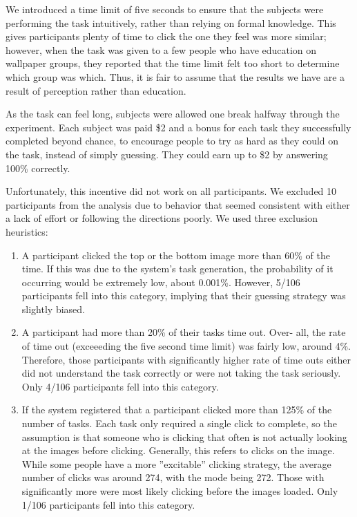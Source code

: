 We introduced a time limit of five seconds to ensure that the subjects were performing the task intuitively, rather than relying on formal knowledge. This gives participants plenty of time to click the one they feel was more similar; however, when the task was given to a few people who have education on wallpaper groups, they reported that the time limit felt too short to determine which group was which. Thus, it is fair to assume that the results we have are a result of perception rather than education.

As the task can feel long, subjects were allowed one break halfway through the experiment. Each subject was paid \$2 and a bonus for each task they successfully completed beyond chance, to encourage people to try as hard as they could on the task, instead of simply guessing. They could earn up to \$2 by answering 100\% correctly.  

Unfortunately, this incentive did not work on all participants. We excluded 10 participants from the analysis due to behavior that seemed consistent with either a lack of effort or following the directions poorly. We used three exclusion heuristics:

\begin{enumerate}
\item{A participant clicked the top or the bottom image more than 60\% of the time. If this was due to the system’s task generation, the probability of it occurring would be extremely low, about 0.001\%. However, 5/106 participants fell into this category, implying that their guessing strategy was slightly biased.}

\item{A participant had more than 20\% of their tasks time out. Over-
all, the rate of time out (exceeeding the five second time limit) was fairly low, around 4\%. Therefore, those participants with significantly higher rate of time outs either did not understand the task correctly or were not taking the task seriously. Only 4/106 participants fell into this category.}

\item{If the system registered that a participant clicked more than 125\% of the number of tasks. Each task only required a single click to complete, so the assumption is that someone who is clicking that often is not actually looking at the images before clicking. Generally, this refers to clicks on the image. While some people have a more ”excitable” clicking strategy, the average number of clicks was around 274, with the mode being 272. Those with significantly more were most likely clicking before the images loaded. Only 1/106 participants fell into this category.}
\end{enumerate}

